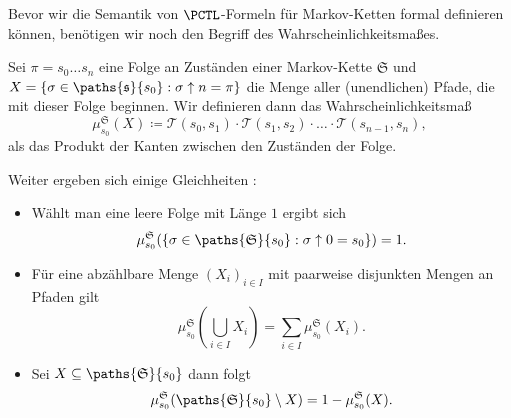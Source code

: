 Bevor wir die Semantik von $\PCTL$-Formeln für Markov-Ketten formal definieren können, benötigen wir noch den Begriff des Wahrscheinlichkeitsmaßes.

\begin{definition}[Wahrscheinlichkeitsmaß]
	Sei $\pi = s_0\dots s_n$ eine Folge an Zuständen einer Markov-Kette $\mathfrak{S}$ und $X=\{\sigma\in \paths{\mathfrak{s}}{s_0} : \sigma\uparrow n = \pi\}$ die Menge aller (unendlichen) Pfade, die mit dieser Folge beginnen. Wir definieren dann das Wahrscheinlichkeitsmaß 
	$$\mu^{\mathfrak{S}}_{s_0}(X)\coloneqq\mathcal{T}(s_0,s_1)\cdot \mathcal{T}(s_1,s_2)\cdot \ldots \cdot \mathcal{T}(s_{n-1},s_n),$$
	als das Produkt der Kanten zwischen den Zuständen der Folge. \cite{hansson1994logic}
\end{definition}

Weiter ergeben sich einige Gleichheiten \cite{hansson1994logic}:
\begin{itemize}
	\item Wählt man eine leere Folge mit Länge $1$ ergibt sich
	\begin{equation}\mu^\mathfrak{S}_{s_0}(\{\sigma\in \paths{\mathfrak{S}}{s_0} : \sigma\uparrow 0 = s_0\})=1.\end{equation}
	\item Für eine abzählbare Menge $(X_i)_{i\in I}$ mit paarweise disjunkten Mengen an Pfaden gilt
	\begin{equation}\mu^\mathfrak{S}_{s_0}(\bigcup_{i\in I}X_i) = \sum_{i\in I}\mu^\mathfrak{S}_{s_0}(X_i).\end{equation}
	\item Sei $X\subseteq \paths{\mathfrak{S}}{s_0}$ dann folgt 
	\begin{equation}\mu^\mathfrak{S}_{s_0}(\paths{\mathfrak{S}}{s_0} \setminus X) = 1-\mu^\mathfrak{S}_{s_0}(X).\label{MassUmkehrung}\end{equation}
\end{itemize}

